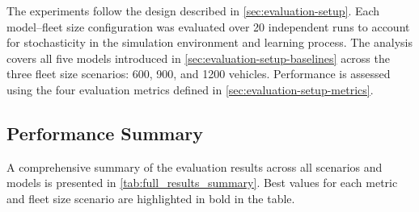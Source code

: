 The experiments follow the design described in \autoref{sec:evaluation-setup}.
Each model–fleet size configuration was evaluated over 20 independent runs to account for stochasticity in the simulation environment and learning process.
The analysis covers all five models introduced in \autoref{sec:evaluation-setup-baselines} across the three fleet size scenarios: 600, 900, and 1200 vehicles.
Performance is assessed using the four evaluation metrics defined in \autoref{sec:evaluation-setup-metrics}.

\subsection{Performance Summary}
A comprehensive summary of the evaluation results across all scenarios and models is presented in \autoref{tab:full_results_summary}.
Best values for each metric and fleet size scenario are highlighted in bold in the table.

